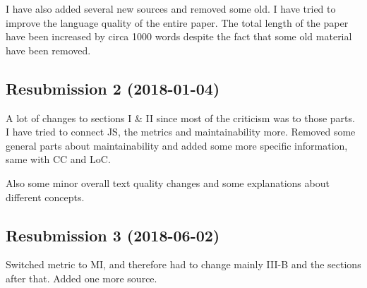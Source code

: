 \documentclass[conference, a4paper]{IEEEtran}
\begin{document}
I have also added several new sources and removed some old. I have tried to improve the language quality of the entire paper. The total length of the paper have been increased by circa 1000 words despite the fact that some old material have been removed.
\subsection{Resubmission 2 (2018-01-04)}

A lot of changes to sections I \& II since most of the criticism was to those parts. I have tried to connect JS, the metrics and maintainability more. Removed some general parts about maintainability and added some more specific information, same with CC and LoC.

Also some minor overall text quality changes and some explanations about different concepts.

\subsection{Resubmission 3 (2018-06-02)}
Switched metric to MI, and therefore had to change mainly III-B and the sections after that. Added one more source.
\end{document}
